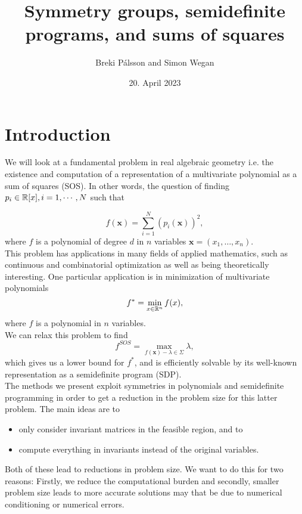 \documentclass[]{article}
\begin{document}
\title{Symmetry groups, semidefinite programs, and sums of squares}
\author{Breki Pálsson and Simon Wegan}
\date{20. April 2023}

\maketitle

\section*{Introduction}
We will look at a fundamental problem in real algebraic geometry i.e. the existence and computation of a
representation of a multivariate polynomial as a sum of squares (SOS). In other words, the
question of finding $p_i \in \mathbb R[x], i = 1, \cdots, N$ such that

\[
    f(\mathbf{x}) = \sum_{i=1}^{N}(p_i(\mathbf{x}))^2,
\]
where $f$ is a polynomial of degree $d$ in $n$ variables $\mathbf{x}=(x_1,\ldots,x_n)$.\\
This problem has applications in many fields of applied mathematics, such as continuous and combinatorial optimization as well as being theoretically interesting. 
One particular application is in minimization of multivariate polynomials
\[
    f^\ast=\min_{x\in\mathbb R^n}f(x),
\]
where $f$ is a polynomial in $n$ variables.\\
We can relax this problem to find 
\[
    f^{SOS}=\max_{f(\mathbf{x})-\lambda \in \Sigma}\lambda,
\]
which gives us a lower bound for $f^\ast$, and is efficiently solvable by its well-known representation as a semidefinite program (SDP).\\

The methods we present exploit symmetries in polynomials and semidefinite programming in order to get a reduction in the problem size for this latter problem. 
The main ideas are to
\begin{itemize}
    \item only consider invariant matrices in the feasible region, and to
    \item compute everything in invariants instead of the original variables.
\end{itemize}
Both of these lead to reductions in problem size.
We want to do this for two reasons: Firstly, we reduce the computational burden and secondly, smaller problem size leads to more accurate solutions may that be due to numerical conditioning or numerical errors.\\
\end{document}
